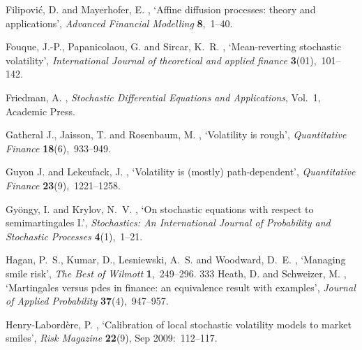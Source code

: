 \documentclass[pdftex,11pt,a4paper] {article}
\begin{document}
\begin{thebibliography}{}
Filipovi{\'c}, D. and Mayerhofer, E.  \harvardyearright , `Affine diffusion processes: theory and
  applications', {\em Advanced Financial Modelling} {\bf 8},~1--40.

Fouque, J.-P., Papanicolaou, G. and Sircar, K.~R.  \harvardyearright , `Mean-reverting stochastic volatility', {\em
  International Journal of theoretical and applied finance} {\bf
  3}(01),~101--142.

Friedman, A.  \harvardyearright , {\em Stochastic
  Differential Equations and Applications}, Vol.~1, Academic Press.

Gatheral J., Jaisson, T. and Rosenbaum, M. \harvardyearright , `Volatility is rough', {\em Quantitative Finance} {\bf 18}(6),~933--949.

Guyon J. and Lekeufack, J. \harvardyearright , `Volatility is (mostly) path-dependent', {\em Quantitative Finance} {\bf 23}(9),~1221--1258.

Gy{\"o}ngy, I. and Krylov, N.~V.  \harvardyearright , `On stochastic equations with respect to
  semimartingales I.', {\em Stochastics: An International Journal of
  Probability and Stochastic Processes} {\bf 4}(1),~1--21.

Hagan, P.~S., Kumar, D., Lesniewski, A.~S. and Woodward, D.~E.
  \harvardyearright , `Managing smile risk', {\em The Best
  of Wilmott} {\bf 1},~249--296.
333
Heath, D. and Schweizer, M.  \harvardyearright ,
  `Martingales versus pdes in finance: an equivalence result with examples',
  {\em Journal of Applied Probability} {\bf 37}(4),~947--957.

Henry-Labord{\`e}re, P.  \harvardyearright , `Calibration of local stochastic volatility models to market smiles', {\em Risk Magazine} {\bf 22}(9), Sep 2009:~112--117.


\end{thebibliography}
\end{document}
